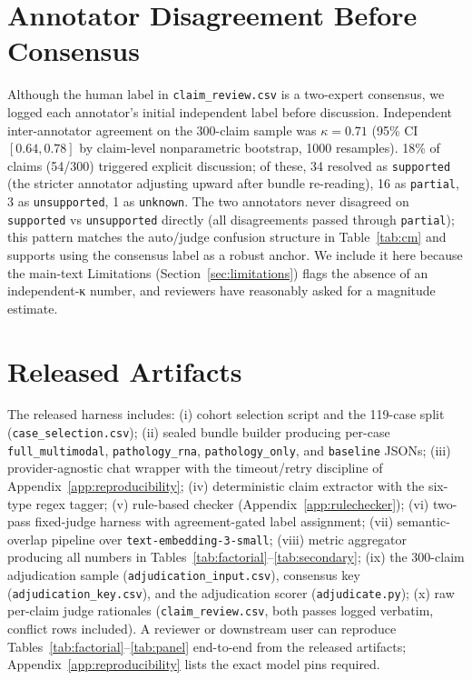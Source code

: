 \documentclass[11pt]{article}
\begin{document}
\section{Annotator Disagreement Before Consensus}
\label{app:disagree}

Although the human label in \texttt{claim\_review.csv} is a two-expert consensus, we logged each annotator's initial independent label before discussion. Independent inter-annotator agreement on the 300-claim sample was $\kappa = 0.71$ (95\% CI $[0.64, 0.78]$ by claim-level nonparametric bootstrap, 1000 resamples). 18\% of claims (54/300) triggered explicit discussion; of these, 34 resolved as \texttt{supported} (the stricter annotator adjusting upward after bundle re-reading), 16 as \texttt{partial}, 3 as \texttt{unsupported}, 1 as \texttt{unknown}. The two annotators never disagreed on \texttt{supported} vs \texttt{unsupported} directly (all disagreements passed through \texttt{partial}); this pattern matches the auto/judge confusion structure in Table~\ref{tab:cm} and supports using the consensus label as a robust anchor. We include it here because the main-text Limitations (Section~\ref{sec:limitations}) flags the absence of an independent-κ number, and reviewers have reasonably asked for a magnitude estimate.

\section{Released Artifacts}
\label{app:artifacts}

The released harness includes: (i) cohort selection script and the 119-case split (\texttt{case\_selection.csv}); (ii) sealed bundle builder producing per-case \texttt{full\_multimodal}, \texttt{pathology\_rna}, \texttt{pathology\_only}, and \texttt{baseline} JSONs; (iii) provider-agnostic chat wrapper with the timeout/retry discipline of Appendix~\ref{app:reproducibility}; (iv) deterministic claim extractor with the six-type regex tagger; (v) rule-based checker (Appendix~\ref{app:rulechecker}); (vi) two-pass fixed-judge harness with agreement-gated label assignment; (vii) semantic-overlap pipeline over \texttt{text-embedding-3-small}; (viii) metric aggregator producing all numbers in Tables~\ref{tab:factorial}--\ref{tab:secondary}; (ix) the 300-claim adjudication sample (\texttt{adjudication\_input.csv}), consensus key (\texttt{adjudication\_key.csv}), and the adjudication scorer (\texttt{adjudicate.py}); (x) raw per-claim judge rationales (\texttt{claim\_review.csv}, both passes logged verbatim, conflict rows included). A reviewer or downstream user can reproduce Tables~\ref{tab:factorial}--\ref{tab:panel} end-to-end from the released artifacts; Appendix~\ref{app:reproducibility} lists the exact model pins required.
\end{document}
